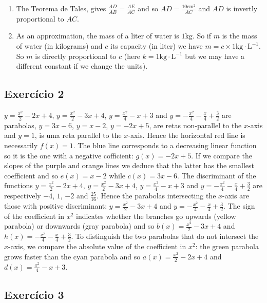 \begin{enumerate}
\item The Teorema de Tales, gives
  $\frac{AD}{AB} = \frac{AE}{AC}$ and so
  $AD = \frac{10 \text{cm}^2}{AC}$ and $AD$ is invertly proportional to
  $AC$.
\item As an approximation, the mass of a liter of water is $1\text{kg}$.
  So if $m$ is the mass of water (in kilograms) and $c$ its capacity
  (in liter) we have $m = c \times 1 {\text{kg}\cdot\text{L}^{-1}}$. So
  $m$ is directly proportional to $c$ (here
  $k = 1 {\text{kg}\cdot\text{L}^{-1}}$ but we may have a different constant
  if we change the units).
\end{enumerate}

\subsection*{Exercício 2}

$y = \frac{x^2}{2} - 2x + 4$, $y= \frac{x^2}{2} - 3x + 4$,
$y=\frac{x^2}{4} - x + 3$ and
$y=-\frac{x^2}{4} -\frac{x}{4} + \frac{3}{2}$ are parabolas,
$y= 3x-6$, $y= x-2$, $y= -2x + 5$, are retas non-parallel to the $x$-axis
and $y = 1$, is uma reta parallel to the $x$-axis. Hence the horizontal
red line is necessarily $f(x) = 1$. The blue line corresponds to a decreasing
linear function so it is the one with a negative cofficient:
$g(x) = -2x + 5$. If we compare the slopes of the purple and orange lines
we deduce that the latter has the smallest coefficient and so
$e(x) = x - 2$ while $c(x) = 3x-6$. The discriminant of the functions
$y = \frac{x^2}{2} - 2x + 4$, $y= \frac{x^2}{2} - 3x + 4$,
$y=\frac{x^2}{4} - x + 3$ and
$y=-\frac{x^2}{4} -\frac{x}{4} + \frac{3}{2}$ are respectively
$-4$, $1$, $-2$ and $\frac{25}{16}$. Hence the parabolas intersecting the
$x$-axis are those with positive discriminant: $y= \frac{x^2}{2} - 3x + 4$
and $y=-\frac{x^2}{4} -\frac{x}{4} + \frac{3}{2}$. The sign of the coefficient
in $x^2$ indicates whether the branches go upwards (yellow parabola) or
downwards (gray parabola) and so $b(x) = \frac{x^2}{2} - 3x + 4$ and
$h(x) = -\frac{x^2}{4} -\frac{x}{4} + \frac{3}{2}$. To distinguish the two
parabolas that do not intersect the $x$-axis, we compare the absolute value
of the coefficient in $x^2$: the green parabola grows faster than the
cyan parabola and so $a(x) = \frac{x^2}{2} - 2x + 4$ and
$d(x) = \frac{x^2}{4} - x + 3$.

\subsection*{Exercício 3}

